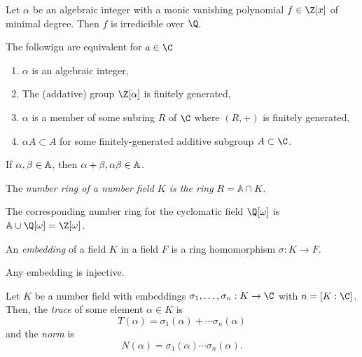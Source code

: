 \begin{theorem}
	Let $\alpha$ be an algebraic integer with a monic vanishing polynomial $f \in \Z[x]$ of minimal degree. Then $f$ is irredicible over $\Q$.
\end{theorem}

\begin{theorem}
	The followign are equivalent for $a \in \C$
	\begin{enumerate}
		\item $\alpha$ is an algebraic integer,
		\item The (addative) group $\Z[\alpha]$ is finitely generated,
		\item $\alpha$ is a member of some subring $R$ of $\C$ where $(R, +)$ is finitely generated,
		\item $\alpha A \subset A$ for some finitely-generated additive subgroup $A \subset \C$.
	\end{enumerate}
\end{theorem}

\begin{corrolary}
	If $\alpha, \beta \in \mathbb A$, then $\alpha + \beta, \alpha \beta \in \mathbb A$.
\end{corrolary}

\begin{definition}
	The \em{number ring} of a number field $K$ is the ring $R = \mathbb A \cap K$.
\end{definition}

\begin{example}
	The corresponding number ring for the cyclomatic field $\Q[\omega]$ is $\A \cup \Q[\omega] = \Z[\omega]$.
\end{example}

\begin{definition}[Embeddings]
	An \textit{embedding} of a field $K$ in a field $F$ is a ring homomorphism $\sigma : K \to F$.
\end{definition}

\begin{theorem}
	Any embedding is injective.
\end{theorem}

\begin{definition}
	Let $K$ be a number field with embeddings $\sigma_1, \ldots, \sigma_n : K \to \C$ with $n = [K : \C]$. Then, the \textit{trace} of some element $\alpha \in K$ is
	\begin{equation}
		T(\alpha) = \sigma_1(\alpha) + \cdots \sigma_n(\alpha)
	\end{equation}
	and the \textit{norm} is
	\begin{equation}
		N(\alpha) = \sigma_1(\alpha) \cdots \sigma_n(\alpha).
	\end{equation}
\end{definition}


